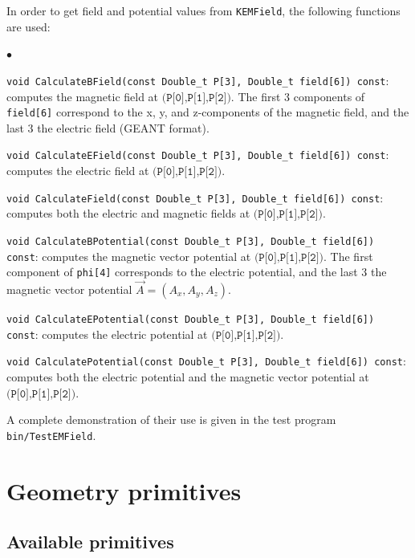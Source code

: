 \documentclass[11pt,a4paper,oneside]{article}
\newcommand{\squishlist}{
   \begin{list}{$\bullet$}
    { \setlength{\itemsep}{0pt}      \setlength{\parsep}{3pt}
      \setlength{\topsep}{3pt}       \setlength{\partopsep}{0pt}
      \setlength{\leftmargin}{1.5em} \setlength{\labelwidth}{1em}
      \setlength{\labelsep}{0.5em} } }
\newcommand{\squishend}{
    \end{list}  }
\begin{document}
In order to get field and potential values from \texttt{KEMField}, the following functions are used:
%
\squishlist
\item \texttt{void CalculateBField(const Double\_t P[3], Double\_t field[6]) const}: computes the magnetic field at $\texttt{(P[0],P[1],P[2])}$.  The first 3 components of \texttt{field[6]} correspond to the x, y, and z-components of the magnetic field, and the last 3 the electric field (GEANT format).  
\item \texttt{void CalculateEField(const Double\_t P[3], Double\_t field[6]) const}: computes the electric field at $\texttt{(P[0],P[1],P[2])}$.
\item \texttt{void CalculateField(const Double\_t P[3], Double\_t field[6]) const}: computes both the electric and magnetic fields at $\texttt{(P[0],P[1],P[2])}$.
\item \texttt{void CalculateBPotential(const Double\_t P[3], Double\_t field[6]) const}: computes the magnetic vector potential at $\texttt{(P[0],P[1],P[2])}$.  The first component of \texttt{phi[4]} corresponds to the electric potential, and the last 3 the magnetic vector potential $\vec{A} = (A_{x},A_{y},A_{z})$.  
\item \texttt{void CalculateEPotential(const Double\_t P[3], Double\_t field[6]) const}: computes the electric potential at $\texttt{(P[0],P[1],P[2])}$.  
\item \texttt{void CalculatePotential(const Double\_t P[3], Double\_t field[6]) const}: computes both the electric potential and the magnetic vector potential at $\texttt{(P[0],P[1],P[2])}$.  
\squishend
%
A complete demonstration of their use is given in the test program \texttt{bin/TestEMField}.  

\section{Geometry primitives}
\label{sec:geometryPrimitives}

\subsection{Available primitives}
\label{subsec:availablePrimitives}
\end{document}
